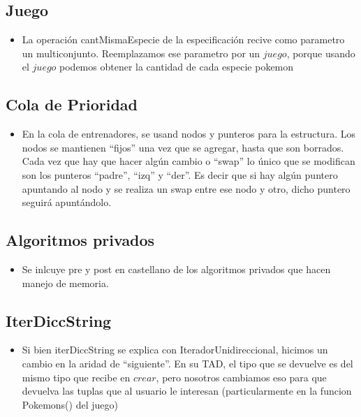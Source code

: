 
\subsection{Juego}

\begin{itemize}
\item{La operaci\'on cantMismaEspecie de la especificaci\'on recive como parametro un multiconjunto. 
Reemplazamos ese parametro por un $juego$, porque usando el $juego$ podemos obtener la cantidad de cada especie pokemon}

\end{itemize}

\subsection{Cola de Prioridad}

\begin{itemize}
\item{En la cola de entrenadores, se usand nodos y punteros para la estructura. Los nodos se mantienen ``fijos'' una vez que se agregar, hasta que son borrados. Cada vez que hay que hacer alg\'un cambio o ``swap'' lo \'unico que se modifican son los punteros ``padre'', ``izq'' y ``der''. Es decir que si hay alg\'un puntero apuntando al nodo y se realiza un swap entre ese nodo y otro, dicho puntero seguir\'a apunt\'andolo.}

\end{itemize}


\subsection{Algoritmos privados}

\begin{itemize}

\item{Se inlcuye pre y post en castellano de los algoritmos privados que hacen manejo de memoria.}

\end{itemize}


\subsection{IterDiccString}

\begin{itemize}

\item{Si bien iterDiccString se explica con IteradorUnidireccional, hicimos un cambio en la aridad de ``siguiente''. En su TAD, el tipo que se devuelve es del mismo tipo que recibe en $crear$, pero nosotros cambiamos eso para que devuelva las tuplas que al usuario le interesan (particularmente en la funcion Pokemons() del juego)}

\end{itemize}


